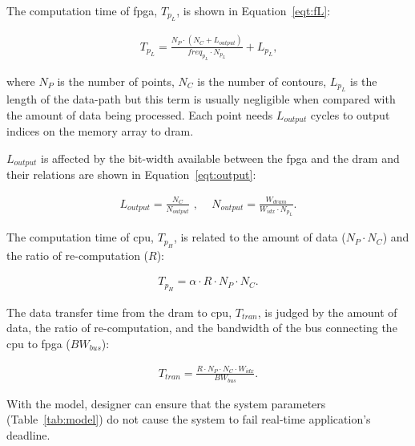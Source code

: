The computation time of \gls{fpga}, $T_{p_L}$, is shown in Equation~\ref{eqt:fL}:

\begin{equation}
\begin{aligned}
T_{p_L} = \frac{N_P \cdot (N_C+L_{output})}{freq_{p_L} \cdot N_{p_L}} + L_{p_L} \mbox{,}
\end{aligned}
\label{eqt:fL}
\end{equation}

where $N_P$ is the number of points, $N_C$ is the number of contours,
$L_{p_L}$ is the length of the data-path but this term is usually negligible when compared with the amount of data being processed.
Each point needs $L_{output}$ cycles to output indices on the memory array to \gls{dram}.

$L_{output}$ is affected by the bit-width available between the \gls{fpga} and the \gls{dram} and their relations are shown in Equation~\ref{eqt:output}:

\begin{equation}
\begin{aligned}
L_{output} = \frac{N_C}{N_{output}} \mbox{ , } \quad
N_{output} = \frac{W_{dram}}{W_{idx} \cdot N_{p_L}} \mbox{.}
\end{aligned}
\label{eqt:output}
\end{equation}

The computation time of \gls{cpu}, $T_{p_H}$, is related to the amount of data ($N_P \cdot N_C$) and the ratio of re-computation ($R$):

\begin{equation}
\begin{aligned}
T_{p_H} = \alpha \cdot R \cdot N_P \cdot N_C \mbox{.}
\end{aligned}
\label{eqt:fH}
\end{equation}

The data transfer time from the \gls{dram} to \gls{cpu}, $T_{tran}$, is judged by the amount of data, the ratio of re-computation, and the bandwidth of the bus connecting the \gls{cpu} to \gls{fpga} ($BW_{bus}$):

\begin{equation}
\begin{aligned}
T_{tran} = \frac{R \cdot N_P \cdot N_C \cdot W_{idx}}{BW_{bus}} \mbox{.}
\end{aligned}
\label{eqt:tran}
\end{equation}

With the model, designer can ensure that the system parameters (Table~\ref{tab:model}) do not cause the system to fail real-time application's deadline.


